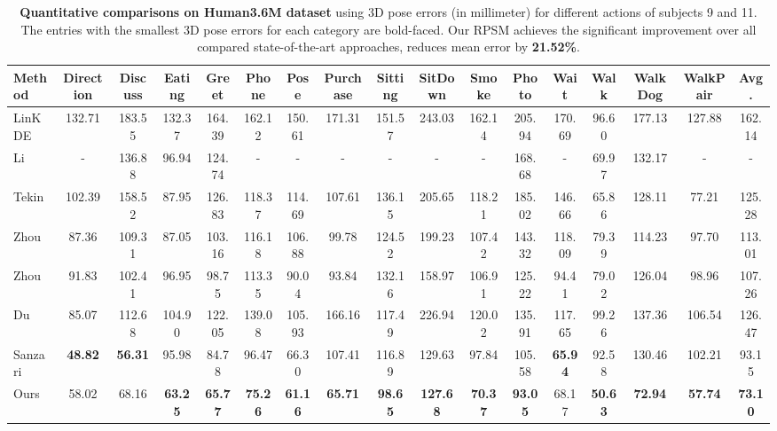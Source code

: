 \documentclass[10pt,twocolumn,letterpaper]{article}
\begin{document}
\begin{table*}[tp]
\setlength{\tabcolsep}{1.5pt}
	\centering
	\begin{adjustbox}{max width=1.0\textwidth}
	\begin{tabular}{@{}l|ccccccccccccccc|c@{}}
	\toprule
	 Method & Direction & Discuss & Eating & Greet & Phone & Pose & Purchase & Sitting & SitDown & Smoke & Photo & Wait & Walk & WalkDog & WalkPair & Avg. \\ \midrule
	LinKDE \cite{huamn3.6m}& 132.71 & 183.55 & 132.37 & 164.39 & 162.12 & 150.61 & 171.31 & 151.57 & 243.03 & 162.14 & 205.94 & 170.69 & 96.60 & 177.13 & 127.88 & 162.14 \\
	Li \etal \cite{li2015maximum} & - & 136.88 & 96.94 & 124.74 & - & - & - & - & - & - & 168.68 &  - & 69.97 & 132.17 & - & - \\
	Tekin \etal \cite{Tekin_2016_CVPR} & 102.39 & 158.52 & 87.95 & 126.83 & 118.37 & 114.69 & 107.61 & 136.15 & 205.65 & 118.21 & 185.02 & 146.66 & 65.86 & 128.11 & 77.21 & 125.28 \\
	Zhou \etal \cite{zhou2015sparseness} & 87.36 & 109.31 & 87.05 & 103.16 & 116.18 & 106.88 & 99.78 & 124.52 & 199.23 & 107.42 & 143.32 & 118.09 & 79.39 & 114.23 & 97.70 & 113.01 \\
	Zhou \etal \cite{zhou2016deep} & 91.83 & 102.41 & 96.95 & 98.75 & 113.35 & 90.04 & 93.84 & 132.16 & 158.97 & 106.91 & 125.22 & 94.41 & 79.02 & 126.04 & 98.96 & 107.26 \\
	Du \etal \cite{DBLP:conf/eccv/DuWLHGWKG16} & 85.07 & 112.68 & 104.90 & 122.05 & 139.08 & 105.93 & 166.16 & 117.49 & 226.94 & 120.02 & 135.91 & 117.65 & 99.26 & 137.36 & 106.54 & 126.47 \\
	Sanzari \etal \cite{DBLP:conf/eccv/SanzariNP16} & \textbf{48.82} & \textbf{56.31} & 95.98 & 84.78 & 96.47 & 66.30 & 107.41 & 116.89 & 129.63 & 97.84 & 105.58 & \textbf{65.94} & 92.58 & 130.46 & 102.21 & 93.15 \\
	Ours & 58.02 & 68.16 & \textbf{63.25} & \textbf{65.77} & \textbf{75.26} & \textbf{61.16} & \textbf{65.71} & \textbf{98.65} & \textbf{127.68} & \textbf{70.37} & \textbf{93.05} & 68.17 & \textbf{50.63} & \textbf{72.94} & \textbf{57.74} & \textbf{73.10} \\
\bottomrule
	\end{tabular}
	\end{adjustbox}
	\vspace{-10pt}
	\caption{\textbf{Quantitative comparisons on Human3.6M dataset} using 3D pose errors (in millimeter) for different actions of subjects 9 and 11. The entries with the smallest 3D pose errors for each category are bold-faced. Our RPSM achieves the significant improvement over all compared state-of-the-art approaches, \ie reduces mean error by \textbf{21.52\%}. }
	\label{table:h3m_res}
\vspace{-10pt}
\end{table*}
\end{document}

